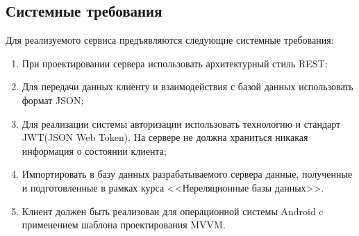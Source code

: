 \subsection{Системные требования}

Для реализуемого сервиса предъявляются следующие системные требования:

\begin{enumerate}
	\item При проектировании сервера использовать архитектурный стиль REST;
	\item Для передачи данных клиенту и взаимодействия с базой данных использовать формат JSON;
	\item Для реализации системы авторизации использовать технологию и стандарт JWT(JSON Web Token). На сервере не должна храниться никакая  информация о состоянии клиента;
	\item Импортировать в базу данных разрабатываемого сервера данные, полученные и подготовленные в рамках курса <<Нереляционные базы данных>>.
	\item Клиент должен быть реализован для операционной системы Android c применением шаблона проектирования MVVM. 
\end{enumerate}


\clearpage